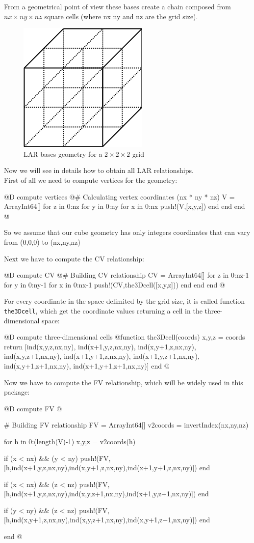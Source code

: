 \documentclass[11pt,oneside]{article}	%
\begin{document}
From a geometrical point of view these bases create a chain composed from $nx \times ny \times nz$ square cells (where nx ny and nz are the grid size).

\begin{figure}[htb] %
   \centering
   \includegraphics[width=0.25\linewidth]{images/larbasis.png}
   \caption{LAR bases geometry for a $2 \times 2 \times 2$ grid}
   \label{fig:larbasis}
\end{figure}

Now we will see in details how to obtain all LAR relationships.\\
First of all we need to compute vertices for the geometry:

@D compute vertices
@{# Calculating vertex coordinates (nx * ny * nz)
V = Array{Int64}[]
for z in 0:nz
  for y in 0:ny
    for x in 0:nx
      push!(V,[x,y,z])
    end
  end
end @}

So we assume that our cube geometry has only integers coordinates that can vary from (0,0,0) to (nx,ny,nz)

Next we have to compute the CV relationship:

@D compute CV
@{# Building CV relationship
CV = Array{Int64}[]
for z in 0:nz-1
  for y in 0:ny-1
    for x in 0:nx-1
      push!(CV,the3Dcell([x,y,z]))
    end
  end
end @}

For every coordinate in the space delimited by the grid size, it is called function \texttt{the3Dcell}, which get the coordinate values returning a cell in the three-dimensional space:

@D compute three-dimensional cells
@{function the3Dcell(coords)
  x,y,z = coords
  return [ind(x,y,z,nx,ny), ind(x+1,y,z,nx,ny), ind(x,y+1,z,nx,ny),
	  ind(x,y,z+1,nx,ny), ind(x+1,y+1,z,nx,ny), ind(x+1,y,z+1,nx,ny),
	  ind(x,y+1,z+1,nx,ny), ind(x+1,y+1,z+1,nx,ny)]
end
@}

Now we have to compute the FV relationship, which will be widely used in this package:

@D compute FV
@{# Building FV relationship
FV = Array{Int64}[]
v2coords = invertIndex(nx,ny,nz)

for h in 0:(length(V)-1)
  x,y,z = v2coords(h)

  if (x < nx) && (y < ny)
    push!(FV, [h,ind(x+1,y,z,nx,ny),ind(x,y+1,z,nx,ny),ind(x+1,y+1,z,nx,ny)])
  end

  if (x < nx) && (z < nz)
    push!(FV, [h,ind(x+1,y,z,nx,ny),ind(x,y,z+1,nx,ny),ind(x+1,y,z+1,nx,ny)])
  end

  if (y < ny) && (z < nz)
    push!(FV,[h,ind(x,y+1,z,nx,ny),ind(x,y,z+1,nx,ny),ind(x,y+1,z+1,nx,ny)])
  end

end @}
\end{document}
